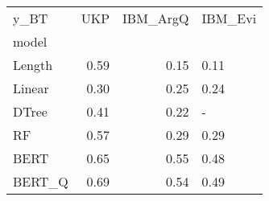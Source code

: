 \begin{tabular}{lrrl}
\toprule
y\_BT &   UKP &  IBM\_ArgQ & IBM\_Evi \\
model  &       &           &         \\
\midrule
Length &  0.59 &      0.15 &    0.11 \\
Linear &  0.30 &      0.25 &    0.24 \\
DTree  &  0.41 &      0.22 &       - \\
RF     &  0.57 &      0.29 &    0.29 \\
BERT   &  0.65 &      0.55 &    0.48 \\
BERT\_Q &  0.69 &      0.54 &    0.49 \\
\bottomrule
\end{tabular}
